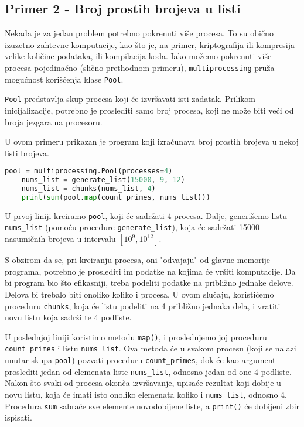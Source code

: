 \documentclass[a4paper]{article}
\begin{document}
{    \subsection{Primer 2 - Broj prostih brojeva u listi}
    Nekada je za jedan problem potrebno pokrenuti više procesa. To su obično izuzetno zahtevne komputacije, kao što je, na primer, kriptografija ili kompresija velike količine podataka, ili kompilacija koda. Iako možemo pokrenuti više procesa pojedinačno (slično prethodnom primeru), \lstinline{multiprocessing} pruža mogućnost korišćenja klase \lstinline{Pool}. 
    \par \lstinline{Pool} predstavlja skup procesa koji će izvršavati isti zadatak. Prilikom inicijalizacije, potrebno je proslediti samo broj procesa, koji ne može biti veći od broja jezgara na procesoru.
    \par U ovom primeru prikazan je program koji izračunava broj prostih brojeva u nekoj listi brojeva.
    \begin{lstlisting}[showstringspaces=false, language=Python]
    pool = multiprocessing.Pool(processes=4)
    nums_list = generate_list(15000, 9, 12)
    nums_list = chunks(nums_list, 4)
    print(sum(pool.map(count_primes, nums_list)))
    \end{lstlisting}
    \par U prvoj liniji kreiramo \lstinline{pool}, koji će sadržati 4 procesa.
    Dalje, generišemo listu \lstinline{nums_list} (pomoću procedure \lstinline{generate_list}), koja će sadržati 15000 nasumičnih brojeva u intervalu $\left [ 10^{9}, 10^{12} \right ]$. 
    \par S obzirom da se, pri kreiranju procesa, oni "odvajaju" od glavne memorije programa, potrebno je proslediti im podatke na kojima će vršiti komputacije. Da bi program bio što efikasniji, treba podeliti podatke na približno jednake delove. Delova bi trebalo biti onoliko koliko i procesa.
    U ovom slučaju, koristićemo proceduru \lstinline{chunks}, koja će listu podeliti na 4 približno jednaka dela, i vratiti novu listu koja sadrži te 4 podliste.
    \par U poslednjoj liniji koristimo metodu \lstinline{map()}, i prosleđujemo joj proceduru \lstinline{count_primes} i listu \lstinline{nums_list}. Ova metoda će u svakom procesu (koji se nalazi unutar skupa \lstinline{pool}) pozvati proceduru \lstinline{count_primes}, dok će kao argument proslediti jedan od elemenata liste \lstinline{nums_list}, odnosno jedan od one 4 podliste. Nakon što svaki od procesa okonča izvršavanje, upisaće rezultat koji dobije u novu listu, koja će imati isto onoliko elemenata koliko i \lstinline{nums_list}, odnosno 4. Procedura \lstinline{sum} sabraće sve elemente novodobijene liste, a \lstinline{print()} će dobijeni zbir ispisati.
}
\end{document}
